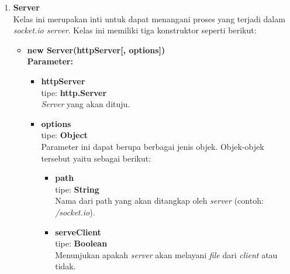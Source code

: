 \begin{enumerate}
	\item \textbf{Server} \\ Kelas ini merupakan inti untuk dapat menangani proses yang terjadi dalam \textit{socket.io server}. Kelas ini memiliki tiga konstruktor seperti berikut: 
	\begin{itemize}
		\item \textbf{new Server(httpServer[, options])} \\ 
		\textbf{Parameter:}
		\begin{itemize}
			\item \textbf{httpServer} \\ tipe: \textbf{http.Server} \\ \textit{Server} yang akan dituju.
			\item \textbf{options} \\ tipe: \textbf{Object} \\ Parameter ini dapat berupa berbagai jenis objek. Objek-objek tersebut yaitu sebagai berikut: 
			\begin{itemize}
				\item \textbf{path} \\ tipe: \textbf{String} \\ Nama dari path yang akan ditangkap oleh \textit{server} (contoh: \textit{/socket.io}).
				
				\item \textbf{serveClient} \\ tipe: \textbf{Boolean} \\ Menunjukan apakah \textit{server} akan melayani \textit{file} dari \textit{client} atau tidak.
				
				
				
			\end{itemize}
		\end{itemize}
	

\end{itemize}
\end{enumerate}
